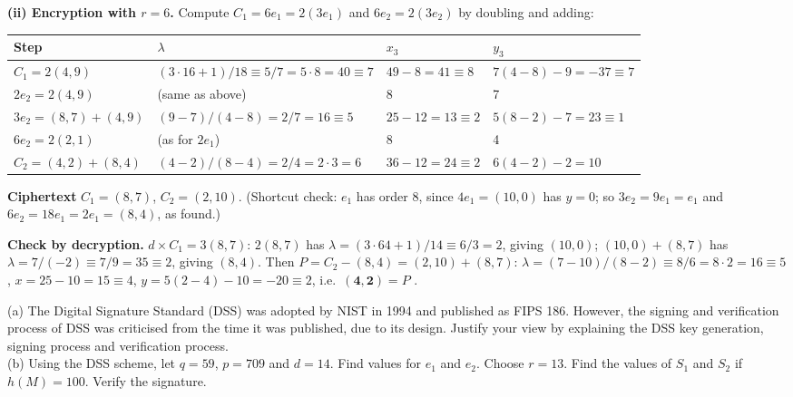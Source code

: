 \textbf{(ii) Encryption with $r = 6$.} Compute $C_1 = 6e_1 = 2(3e_1)$ and $6e_2 = 2(3e_2)$ by doubling and adding:
\begin{center}\small
\begin{tabular}{@{}llll@{}}
\toprule
Step & $\lambda$ & $x_3$ & $y_3$\\
\midrule
$C_1 = 2(4, 9)$ & $(3 \cdot 16 + 1)/18 \equiv 5/7 = 5 \cdot 8 = 40 \equiv 7$ & $49 - 8 = 41 \equiv 8$ & $7(4 - 8) - 9 = -37 \equiv 7$\\
$2e_2 = 2(4, 9)$ & (same as above) & 8 & 7\\
$3e_2 = (8, 7) + (4, 9)$ & $(9 - 7)/(4 - 8) = 2/7 = 16 \equiv 5$ & $25 - 12 = 13 \equiv 2$ & $5(8 - 2) - 7 = 23 \equiv 1$\\
$6e_2 = 2(2, 1)$ & (as for $2e_1$) & 8 & 4\\
$C_2 = (4, 2) + (8, 4)$ & $(4 - 2)/(8 - 4) = 2/4 = 2 \cdot 3 = 6$ & $36 - 12 = 24 \equiv 2$ & $6(4 - 2) - 2 = 10$\\
\bottomrule
\end{tabular}
\end{center}
\textbf{Ciphertext} $C_1 = (8, 7)$, $C_2 = (2, 10)$. (Shortcut check: $e_1$ has order 8, since $4e_1 = (10, 0)$ has $y = 0$; so $3e_2 = 9e_1 = e_1$ and $6e_2 = 18e_1 = 2e_1 = (8, 4)$, as found.)

\textbf{Check by decryption.} $d \times C_1 = 3(8, 7)$: $2(8, 7)$ has $\lambda = (3 \cdot 64 + 1)/14 \equiv 6/3 = 2$, giving $(10, 0)$; $(10, 0) + (8, 7)$ has $\lambda = 7/(-2) \equiv 7/9 = 35 \equiv 2$, giving $(8, 4)$. Then $P = C_2 - (8, 4) = (2, 10) + (8, 7)$: $\lambda = (7 - 10)/(8 - 2) \equiv 8/6 = 8 \cdot 2 = 16 \equiv 5$, $x = 25 - 10 = 15 \equiv 4$, $y = 5(2 - 4) - 10 = -20 \equiv 2$, i.e.\ $\mathbf{(4, 2)} = P$ \checkmark.

\begin{keybox}[title={Q2 (10 marks)}]
(a) The Digital Signature Standard (DSS) was adopted by NIST in 1994 and published as FIPS 186. However, the signing and verification process of DSS was criticised from the time it was published, due to its design. Justify your view by explaining the DSS key generation, signing process and verification process.\\
(b) Using the DSS scheme, let $q = 59$, $p = 709$ and $d = 14$. Find values for $e_1$ and $e_2$. Choose $r = 13$. Find the values of $S_1$ and $S_2$ if $h(M) = 100$. Verify the signature.
\end{keybox}

